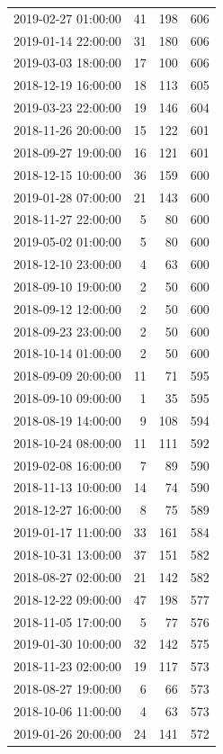 \begin{tabular}{lrrr}
2019-02-27 01:00:00 & 41 & 198 & 606 \\
2019-01-14 22:00:00 & 31 & 180 & 606 \\
2019-03-03 18:00:00 & 17 & 100 & 606 \\
2018-12-19 16:00:00 & 18 & 113 & 605 \\
2019-03-23 22:00:00 & 19 & 146 & 604 \\
2018-11-26 20:00:00 & 15 & 122 & 601 \\
2018-09-27 19:00:00 & 16 & 121 & 601 \\
2018-12-15 10:00:00 & 36 & 159 & 600 \\
2019-01-28 07:00:00 & 21 & 143 & 600 \\
2018-11-27 22:00:00 & 5 & 80 & 600 \\
2019-05-02 01:00:00 & 5 & 80 & 600 \\
2018-12-10 23:00:00 & 4 & 63 & 600 \\
2018-09-10 19:00:00 & 2 & 50 & 600 \\
2018-09-12 12:00:00 & 2 & 50 & 600 \\
2018-09-23 23:00:00 & 2 & 50 & 600 \\
2018-10-14 01:00:00 & 2 & 50 & 600 \\
2018-09-09 20:00:00 & 11 & 71 & 595 \\
2018-09-10 09:00:00 & 1 & 35 & 595 \\
2018-08-19 14:00:00 & 9 & 108 & 594 \\
2018-10-24 08:00:00 & 11 & 111 & 592 \\
2019-02-08 16:00:00 & 7 & 89 & 590 \\
2018-11-13 10:00:00 & 14 & 74 & 590 \\
2018-12-27 16:00:00 & 8 & 75 & 589 \\
2019-01-17 11:00:00 & 33 & 161 & 584 \\
2018-10-31 13:00:00 & 37 & 151 & 582 \\
2018-08-27 02:00:00 & 21 & 142 & 582 \\
2018-12-22 09:00:00 & 47 & 198 & 577 \\
2018-11-05 17:00:00 & 5 & 77 & 576 \\
2019-01-30 10:00:00 & 32 & 142 & 575 \\
2018-11-23 02:00:00 & 19 & 117 & 573 \\
2018-08-27 19:00:00 & 6 & 66 & 573 \\
2018-10-06 11:00:00 & 4 & 63 & 573 \\
2019-01-26 20:00:00 & 24 & 141 & 572 \\

\end{tabular}
